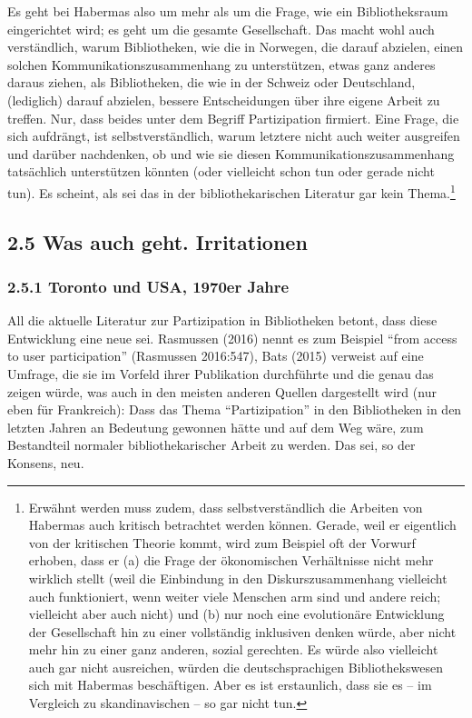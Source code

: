 \documentclass[a4paper,
fontsize=11pt,
oneside,
numbers=noperiodatend,
parskip=half-,
bibliography=totoc,
final
]{scrartcl}
\begin{document}
Es geht bei Habermas also um mehr als um die Frage, wie ein
Bibliotheksraum eingerichtet wird; es geht um die gesamte Gesellschaft.
Das macht wohl auch verständlich, warum Bibliotheken, wie die in
Norwegen, die darauf abzielen, einen solchen Kommunikationszusammenhang
zu unterstützen, etwas ganz anderes daraus ziehen, als Bibliotheken, die
wie in der Schweiz oder Deutschland, (lediglich) darauf abzielen,
bessere Entscheidungen über ihre eigene Arbeit zu treffen. Nur, dass
beides unter dem Begriff Partizipation firmiert. Eine Frage, die sich
aufdrängt, ist selbstverständlich, warum letztere nicht auch weiter
ausgreifen und darüber nachdenken, ob und wie sie diesen
Kommunikationszusammenhang tatsächlich unterstützen könnten (oder
vielleicht schon tun oder gerade nicht tun). Es scheint, als sei das in
der bibliothekarischen Literatur gar kein Thema.\footnote{Erwähnt werden
  muss zudem, dass selbstverständlich die Arbeiten von Habermas auch
  kritisch betrachtet werden können. Gerade, weil er eigentlich von der
  kritischen Theorie kommt, wird zum Beispiel oft der Vorwurf erhoben,
  dass er (a) die Frage der ökonomischen Verhältnisse nicht mehr
  wirklich stellt (weil die Einbindung in den Diskurszusammenhang
  vielleicht auch funktioniert, wenn weiter viele Menschen arm sind und
  andere reich; vielleicht aber auch nicht) und (b) nur noch eine
  evolutionäre Entwicklung der Gesellschaft hin zu einer vollständig
  inklusiven denken würde, aber nicht mehr hin zu einer ganz anderen,
  sozial gerechten. Es würde also vielleicht auch gar nicht ausreichen,
  würden die deutschsprachigen Bibliothekswesen sich mit Habermas
  beschäftigen. Aber es ist erstaunlich, dass sie es -- im Vergleich zu
  skandinavischen -- so gar nicht tun.}

\hypertarget{was-auch-geht.-irritationen}{%
\subsection{2.5 Was auch geht.
Irritationen}\label{was-auch-geht.-irritationen}}

\hypertarget{toronto-und-usa-1970er-jahre}{%
\subsubsection{2.5.1 Toronto und USA, 1970er
Jahre}\label{toronto-und-usa-1970er-jahre}}

All die aktuelle Literatur zur Partizipation in Bibliotheken betont,
dass diese Entwicklung eine neue sei. Rasmussen (2016) nennt es zum
Beispiel \enquote{from access to user participation} (Rasmussen
2016:547), Bats (2015) verweist auf eine Umfrage, die sie im Vorfeld
ihrer Publikation durchführte und die genau das zeigen würde, was auch
in den meisten anderen Quellen dargestellt wird (nur eben für
Frankreich): Dass das Thema \enquote{Partizipation} in den Bibliotheken
in den letzten Jahren an Bedeutung gewonnen hätte und auf dem Weg wäre,
zum Bestandteil normaler bibliothekarischer Arbeit zu werden. Das sei,
so der Konsens, neu.
\end{document}
